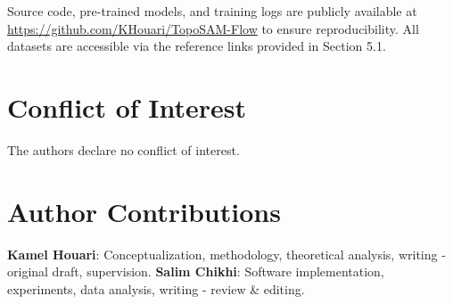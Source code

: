 \documentclass[12pt, a4paper]{article}
\begin{document}
Source code, pre-trained models, and training logs are publicly available at \url{https://github.com/KHouari/TopoSAM-Flow} to ensure reproducibility. All datasets are accessible via the reference links provided in Section 5.1.

\section*{Conflict of Interest}

The authors declare no conflict of interest.

\section*{Author Contributions}

\textbf{Kamel Houari}: Conceptualization, methodology, theoretical analysis, writing - original draft, supervision. \textbf{Salim Chikhi}: Software implementation, experiments, data analysis, writing - review \& editing.
\end{document}
